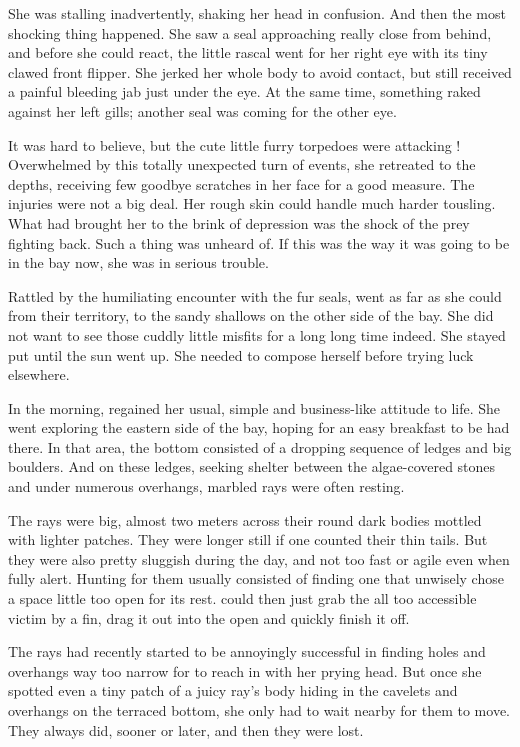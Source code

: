 She was stalling inadvertently, shaking her head in confusion. And then the most shocking thing happened. She saw a seal approaching really close from behind, and before she could react, the little rascal went for her right eye with its tiny clawed front flipper. She jerked her whole body to avoid contact, but still received a painful bleeding jab just under the eye. At the same time, something raked against her left gills; another seal was coming for the other eye. 

It was hard to believe, but the cute little furry torpedoes were attacking \sharknameformal! Overwhelmed by this totally unexpected turn of events, she retreated to the depths, receiving few goodbye scratches in her face for a good measure. 
The injuries were not a big deal. Her rough skin could handle much harder tousling. What had brought her to the brink of depression was the shock of the prey fighting back. Such a thing was unheard of. If this was the way it was going to be in the bay now, she was in serious trouble.

\mybreak

Rattled by the humiliating encounter with the fur seals, \sharknameformal went as far as she could from their territory, to the sandy shallows on the other side of the bay. She did not want to see those cuddly little misfits for a long long time indeed. She stayed put until the sun went up. She needed to compose herself before trying luck elsewhere. 

In the morning, \sharknameformal regained her usual, simple and business-like attitude to life. She went exploring the eastern side of the bay, hoping for an easy breakfast to be had there. In that area, the bottom consisted of a dropping sequence of ledges and big boulders. And on these ledges, seeking shelter between the algae-covered stones and under numerous overhangs, marbled rays were often resting.

The rays were big, almost two meters across their round dark bodies mottled with lighter patches. They were longer still if one counted their thin tails. But they were also pretty sluggish during the day, and not too fast or agile even when fully alert. Hunting for them usually consisted of finding one that unwisely chose a space little too open for its rest. \sharknameformal could then just grab the all too accessible victim by a fin, drag it out into the open and quickly finish it off. 

The rays had recently started to be annoyingly successful in finding holes and overhangs way too narrow for \sharknameformal to reach in with her prying head. But once she spotted even a tiny patch of a juicy ray's body hiding in the cavelets and overhangs on the terraced bottom, she only had to wait nearby for them to move. They always did, sooner or later, and then they were lost.

